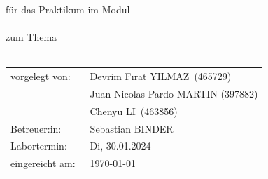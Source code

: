 %
%
%
%
%
\begin{titlepage}
\thispagestyle{scrheadings}
%
\setlength{\headheight}{103.0pt}

\chead[]{}
\ifoot[]{}
\cfoot[]{}
\ofoot[]{}
%
\noindent
\uni\\
\faculty\\
\institute\\
\department\\
%
\vspace{0.5cm}
\begin{center}
  \Large{\textbf{\textsc{\eventtype} \eventnumber}}\\[3.6ex]
  \Large{für das Praktikum im Modul}\\
  \Large{\textbf{\course}}\\[1.2ex]
  \Large{zum Thema}\\
  \Large{\textbf{\eventtopic}}\\[6.0ex]
  \normalsize
  \begin{tabular}{b{5.4cm}b{12cm}}%
    vorgelegt von:  & \quad \ Devrim Fırat YILMAZ\ (465729)\\[1.2ex]
                    & \quad \ Juan Nicolas Pardo MARTIN (397882)\\[1.2ex]
                    & \quad \ Chenyu LI\ (463856)\\[1.2ex] 

    Betreuer:in:    & \quad \ Sebastian BINDER\\[1.2ex] 
    Labortermin:    & \quad \ Di, 30.01.2024 \\[1.2ex]
    eingereicht am: & \quad \ \today
  \end{tabular}
\end{center}
%
\end{titlepage}
%
%
%
